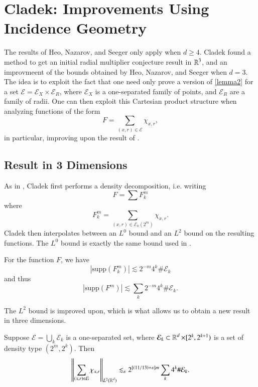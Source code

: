 \chapter{Cladek: Improvements Using Incidence Geometry} \label{Cladek}

The results of Heo, Nazarov, and Seeger only apply when $d \geq 4$. Cladek found a method to get an initial radial multiplier conjecture result in $\operatorname{\mathbb{R}}^3$, and an improvmeent of the bounds obtained by Heo, Nazarov, and Seeger when $d = 3$. The idea is to exploit the fact that one need only prove a version of \ref{lemma2} for a set $\mathcal{E} = \mathcal{E}_X \times \mathcal{E}_R$, where $\mathcal{E}_X$ is a one-separated family of points, and $\mathcal{E}_R$ are a family of radii. One can then exploit this Cartesian product structure when analyzing functions of the form
%
\[ F = \sum_{(x,r) \in \mathcal{E}} \chi_{x,r}, \]
%
in particular, improving upon the result of \cite{HeoandNazarovandSeeger}.

\section{Result in 3 Dimensions}

As in \cite{HeoandNazarovandSeeger}, Cladek first performs a density decomposition, i.e. writing
%
\[ F = \sum F_k^m \]
%
where
%
\[ F_k^m = \sum_{(x,r) \in \mathcal{E}_k(2^m)} \chi_{x,r}. \]
%
Cladek then interpolates between an $L^0$ bound and an $L^2$ bound on the resulting functions. The $L^0$ bound is exactly the same bound used in \cite{HeoandNazarovandSeeger}.

\begin{theorem}
    For the function $F$, we have
    \[ |\text{supp}(F_k^m)| \lesssim 2^{-m} 4^k \# \mathcal{E}_k \]
    and thus
    \[ |\text{supp}(F^m)| \lesssim \sum_k 2^{-m} 4^k \# \mathcal{E}_k. \]
\end{theorem}

The $L^2$ bound is improved upon, which is what allows us to obtain a new result in three dimensions.

\begin{lemma} \label{cladeksl2}
    Suppose $\mathcal{E} = \bigcup_k \mathcal{E}_k$ is a one-separated set, where $\mathcal{E}_k \subset \operatorname{\mathbb{R}}^d \times [2^k,2^{k+1})$ is a set of density type $(2^m, 2^k)$. Then
    \[ \left\| \sum_{(x,r) \in \mathcal{E}} \chi_{x,r} \right\|_{L^2(\operatorname{\mathbb{R}}^d)} \lesssim_\varepsilon 2^{[(11/13) + \varepsilon] m} \sum_k 4^k \# \mathcal{E}_k. \]
\end{lemma}

